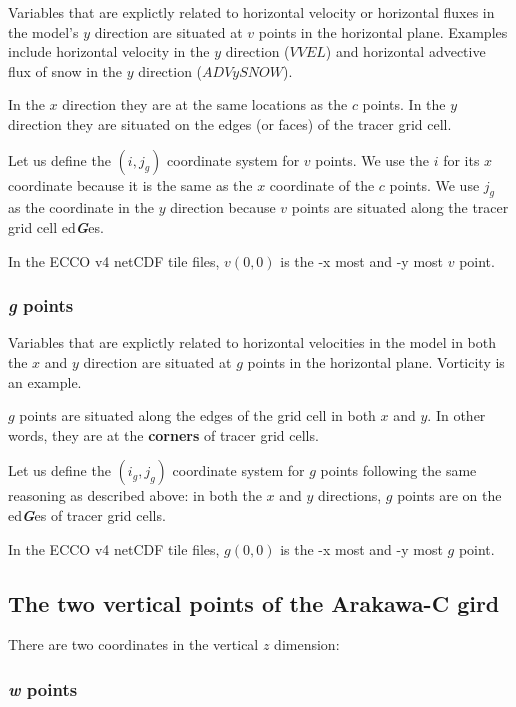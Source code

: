 \documentclass[11pt]{article}
\begin{document}
Variables that are explictly related to horizontal velocity or
horizontal fluxes in the model's \(y\) direction are situated at \(v\)
points in the horizontal plane. Examples include horizontal velocity in
the \(y\) direction (\(VVEL\)) and horizontal advective flux of snow in
the \(y\) direction (\(ADVySNOW\)).

In the \(x\) direction they are at the same locations as the \(c\)
points. In the \(y\) direction they are situated on the edges (or faces)
of the tracer grid cell.

Let us define the \((i, j_g)\) coordinate system for \(v\) points. We
use the \(i\) for its \(x\) coordinate because it is the same as the
\(x\) coordinate of the \(c\) points. We use \(j_g\) as the coordinate
in the \(y\) direction because \(v\) points are situated along the
tracer grid cell ed\textbf{\emph{G}}es.

In the ECCO v4 netCDF tile files, \(v(0,0)\) is the -x most and -y most
\(v\) point.

\subsubsection{\texorpdfstring{\emph{g}
points}{g points}}\label{g-points}

Variables that are explictly related to horizontal velocities in the
model in both the \(x\) and \(y\) direction are situated at \(g\) points
in the horizontal plane. Vorticity is an example.

\(g\) points are situated along the edges of the grid cell in both \(x\)
and \(y\). In other words, they are at the \textbf{corners} of tracer
grid cells.

Let us define the \((i_g, j_g)\) coordinate system for \(g\) points
following the same reasoning as described above: in both the \(x\) and
\(y\) directions, \(g\) points are on the ed\textbf{\emph{G}}es of
tracer grid cells.

In the ECCO v4 netCDF tile files, \(g(0,0)\) is the -x most and -y most
\(g\) point.

\subsection{The two vertical points of the Arakawa-C
gird}\label{the-two-vertical-points-of-the-arakawa-c-gird}

There are two coordinates in the vertical \(z\) dimension:

\subsubsection{\texorpdfstring{\emph{w}
points}{w points}}\label{w-points}
\end{document}
